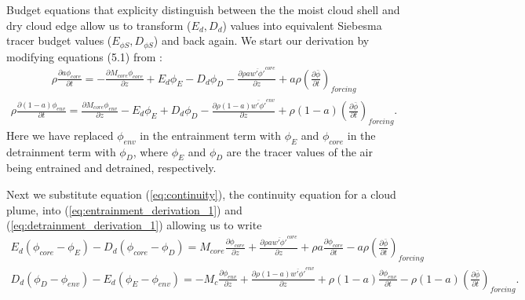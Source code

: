 \documentclass[12pt]{article}
\begin{document}
Budget equations that explicity distinguish between the the moist
cloud shell and dry cloud edge allow us to transform ($E_d, D_d$)
values into equivalent Siebesma tracer budget values ($E_{\phi S},
D_{\phi S}$) and back again.  We start our derivation by modifying
equations (5.1) from \cite{Siebesma1995}:
\begin{eqnarray}
  \label{eq:entrainment_derivation_1}
    \rho \frac{\partial a \phi_{core}}{\partial t} 
    = - \frac{\partial M_{core} \phi_{core}}{\partial z} 
    + E_d \phi_E - D_d \phi_D
    - \frac{\partial \rho a \overline{w' \phi'}^{core}}{\partial z} 
    + a \rho \left(\frac{\partial \bar{\phi}}{\partial t}\right)_{forcing}
\end{eqnarray}
\begin{eqnarray}
  \label{eq:detrainment_derivation_1}
    \rho \frac{\partial (1 - a) \phi_{env}}{\partial t}
    = \frac{\partial M_{core} \phi_{env}}{\partial z} 
    - E_d \phi_E + D_d \phi_D
    - \frac{\partial \rho (1 - a) \overline{w' \phi'}^{env}}{\partial z} 
    + \rho (1 - a) \left(\frac{\partial \bar{\phi}}{\partial t}\right)_{forcing}.
\end{eqnarray}
Here we have replaced $\phi_{env}$ in the entrainment term with $\phi_E$ and 
$\phi_{core}$ in the detrainment term with $\phi_D$, where $\phi_E$ and $\phi_D$
are the tracer values of the air being entrained and detrained, respectively.

Next we substitute equation (\ref{eq:continuity}), the continuity equation 
for a cloud plume, into (\ref{eq:entrainment_derivation_1}) 
and (\ref{eq:detrainment_derivation_1}) allowing us to write
\begin{eqnarray}
  \label{eq:entrainment_derivation_2}
    E_d (\phi_{core} - \phi_E) - D_d (\phi_{core} - \phi_D)
    = M_{core} \frac{\partial \phi_{core}}{\partial z}
    + \frac{\partial \rho a \overline{w' \phi'}^{core}}{\partial z} 
    + \rho a \frac{\partial \phi_{core}}{\partial t}
    - a \rho \left(\frac{\partial \bar{\phi}}{\partial t}\right)_{forcing}
\end{eqnarray}
\begin{eqnarray}
  \label{eq:detrainment_derivation_2}
    D_d (\phi_D - \phi_{env}) - E_d (\phi_E - \phi_{env})
    = - M_c \frac{\partial \phi_{env}}{\partial z}
    + \frac{\partial \rho (1 - a) \overline{w' \phi'}^{env}}{\partial z} 
    + \rho (1 - a) \frac{\partial \phi_{env}}{\partial t}
    - \rho (1 - a) \left(\frac{\partial \bar{\phi}}{\partial t}\right)_{forcing}.
\end{eqnarray}
\end{document}
